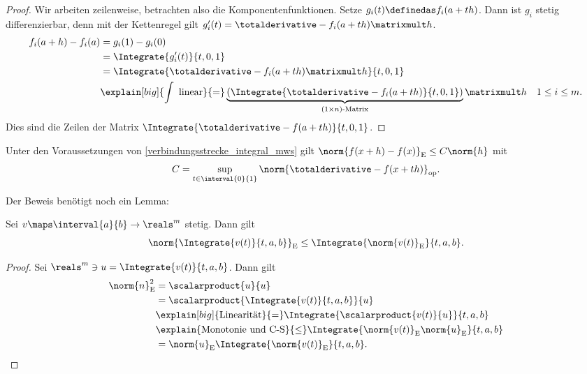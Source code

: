 \begin{proof}
    Wir arbeiten zeilenweise, betrachten also die Komponentenfunktionen. Setze \( g_i(t)\definedas f_i(a+th) \). Dann ist \( g_i \) stetig differenzierbar, denn mit der Kettenregel gilt \( g_i'(t)=\totalderivative-{f}_i(a+th)\matrixmult h \).
    \begin{equation*}
        \begin{split}
            f_i(a+h)-f_i(a)&=g_i(1)-g_i(0)\\
            &=\Integrate{g_i'(t)}{t,0,1}\\
            &=\Integrate{\totalderivative-{f}_i(a+th)\matrixmult h}{t,0,1}\\
            &\explain[big]{\int \text{ linear}}{=}\underbrace{\left( \Integrate{\totalderivative-{f}_i(a+th)}{t,0,1} \right)}_{(1\times n)\text{-Matrix}}\matrixmult h\quad 1\leq i \leq m.
        \end{split}
    \end{equation*}
    Dies sind die Zeilen der Matrix \( \Integrate{\totalderivative-{f}(a+th)}{t,0,1} \).
\end{proof}
\begin{folgerung}\label{differenz_abschaetzung_ableitung_verbindungsstrecke}
    Unter den Voraussetzungen von \ref{verbindungsstrecke_integral_mws} gilt \( \norm{f(x+h)-f(x)}_{\text{E}}\leq C\norm{h} \) mit
    \begin{equation*}
        C=\sup_{t\in \interval{0}{1}}\norm{\totalderivative-{f}(x+th)}_{\text{op}}.
    \end{equation*}
\end{folgerung}
Der Beweis benötigt noch ein Lemma:
\begin{lemma}\label{integral_norm_dreiecksungleichung}
    Sei \( v\maps \interval{a}{b}\to \reals^m \) stetig. Dann gilt
    \begin{equation*}
        \norm{\Integrate{v(t)}{t,a,b}}_{\text{E}}\leq \Integrate{\norm{v(t)}_{\text{E}}}{t,a,b}.
    \end{equation*}
\end{lemma}
\begin{proof}
    Sei \( \reals^m\ni u=\Integrate{v(t)}{t,a,b} \). Dann gilt
    \begin{equation*}
        \begin{split}
            \norm{n}_{\text{E}}^2&=\scalarproduct{u}{u}\\
            &=\scalarproduct{\Integrate{v(t)}{t,a,b}}{u}\\
            &\explain[big]{\text{Linearität}}{=}\Integrate{\scalarproduct{v(t)}{u}}{t,a,b}\\
            &\explain{\text{Monotonie und C-S}}{\leq}\Integrate{\norm{v(t)}_{\text{E}}\norm{u}_{\text{E}}}{t,a,b}\\
            &=\norm{u}_{\text{E}} \Integrate{\norm{v(t)}_{\text{E}}}{t,a,b}.
        \end{split}
    \end{equation*}
\end{proof}
